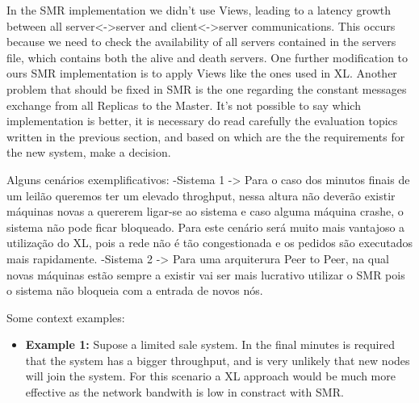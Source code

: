 \documentclass[times, 10pt,twocolumn]{article}
\begin{document}
In the SMR implementation we didn't use Views, leading to a latency growth between all server<->server and client<->server communications. 
This occurs because we need to check the availability of all servers contained in the servers file, which contains both the alive and death 
servers. One further modification to ours SMR implementation is to apply Views like the ones used in XL. 
Another problem that should be fixed in SMR is the one regarding the constant messages exchange from all Replicas to the Master.
It's not possible to say which implementation is better, it is necessary do read carefully the evaluation topics written in the previous section,
and based on which are the the requirements for the new system, make a decision.

Alguns cenários exemplificativos:
-Sistema 1 -> Para o caso dos minutos finais de um leilão queremos ter um elevado throghput, nessa altura não deverão existir máquinas novas a 
quererem ligar-se ao sistema e caso alguma máquina crashe, o sistema não pode ficar bloqueado. Para este cenário será muito mais vantajoso a 
utilização do XL, pois a rede não é tão congestionada e os pedidos são executados mais rapidamente. 
-Sistema 2 -> Para uma arquiterura Peer to Peer, na qual novas máquinas estão sempre a existir vai ser mais lucrativo utilizar o SMR pois o sistema
não bloqueia com a entrada de novos nós.

Some context examples:
\begin{itemize}
	\item \textbf{Example 1:} Supose a limited sale system. In the final minutes is required that the system has a bigger throughput, and is very unlikely that new nodes will join the system. For this scenario a XL approach would be much more effective as the network bandwith is low in constract with SMR.
\end{itemize}

\nocite{ex1,ex2}


\end{document}
